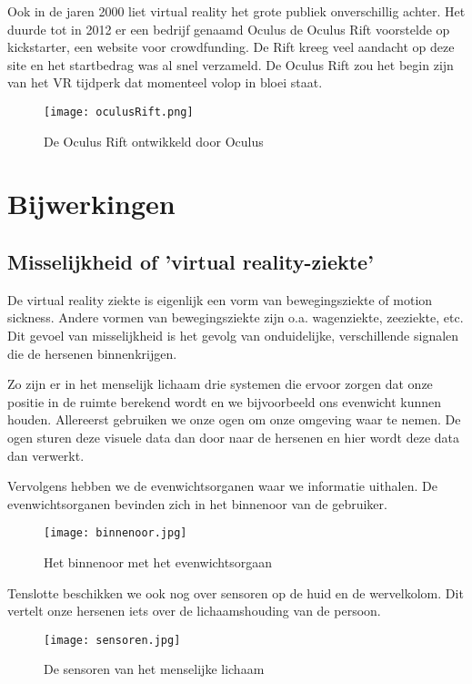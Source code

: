 Ook in de jaren 2000 liet virtual reality het grote publiek onverschillig achter. Het duurde tot in 2012 er een bedrijf genaamd Oculus de Oculus Rift voorstelde op kickstarter, een website voor crowdfunding. De Rift kreeg veel aandacht op deze site en het startbedrag was al snel verzameld. De Oculus Rift zou het begin zijn van het VR tijdperk dat momenteel volop in bloei staat.

\begin{figure}[h]
    \centering
    \texttt{[image: oculusRift.png]}
    \caption{De Oculus Rift ontwikkeld door Oculus}
\end{figure}

\section{Bijwerkingen}
\subsection{Misselijkheid of 'virtual reality-ziekte'}

De virtual reality ziekte is eigenlijk een vorm van bewegingsziekte of motion sickness. Andere vormen van bewegingsziekte zijn o.a. wagenziekte, zeeziekte, etc. Dit gevoel van misselijkheid is het gevolg van onduidelijke, verschillende signalen die de hersenen binnenkrijgen.

Zo zijn er in het menselijk lichaam drie systemen die ervoor zorgen dat onze positie in de ruimte berekend wordt en we bijvoorbeeld ons evenwicht kunnen houden.
Allereerst gebruiken we onze ogen om onze omgeving waar te nemen. De ogen sturen deze visuele data dan door naar de hersenen en hier wordt deze data dan verwerkt.

Vervolgens hebben we de evenwichtsorganen waar we informatie uithalen. De evenwichtsorganen bevinden zich in het binnenoor van de gebruiker.

\begin{figure}[h]
    \centering
    \texttt{[image: binnenoor.jpg]}
    \caption{Het binnenoor met het evenwichtsorgaan}
\end{figure}

Tenslotte beschikken we ook nog over sensoren op de huid en de wervelkolom. Dit vertelt onze hersenen iets over de lichaamshouding van de persoon.

\begin{figure}[h]
    \centering
    \texttt{[image: sensoren.jpg]}
    \caption{De sensoren van het menselijke lichaam}
\end{figure}

